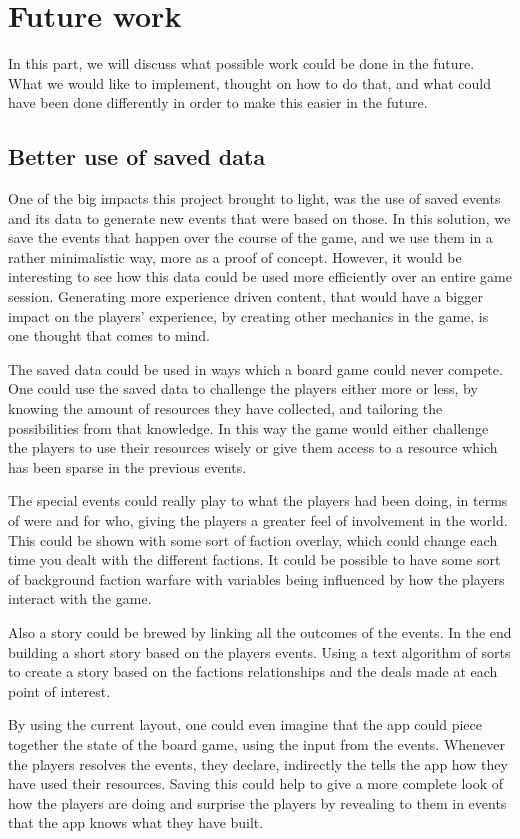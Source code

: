 \section{Future work}
In this part, we will discuss what possible work could be done in the future. What we would like to implement, thought on how to do that, and what could have been done differently in order to make this easier in the future.

\subsection{Better use of saved data}
\label{sec:savdat}
One of the big impacts this project brought to light, was the use of saved events and its data to generate new events that were based on those. In this solution, we save the events that happen over the course of the game, and we use them in a rather minimalistic way, more as a proof of concept. However, it would be interesting to see how this data could be used more efficiently over an entire game session. Generating more experience driven content, that would have a bigger impact on the players' experience, by creating other mechanics in the game, is one thought that comes to mind. 

The saved data could be used in ways which a board game could never compete. One could use the saved data to challenge the players either more or less, by knowing the amount of resources they have collected, and tailoring the possibilities from that knowledge. In this way the game would either challenge the players to use their resources wisely or give them access to a resource which has been sparse in the previous events. 

The special events could really play to what the players had been doing, in terms of were and for who, giving the players a greater feel of involvement in the world. This could be shown with some sort of faction overlay, which could change each time you dealt with the different factions. It could be possible to have some sort of background faction warfare with variables being influenced by how the players interact with the game.

Also a story could be brewed by linking all the outcomes of the events. In the end building a short story based on the players events. Using a text algorithm of sorts to create a story based on the factions relationships and the deals made at each point of interest. 

By using the current layout, one could even imagine that the app could piece together the state of the board game, using the input from the events. Whenever the players resolves the events, they declare, indirectly the tells the app how they have used their resources. Saving this could help to give a more complete look of how the players are doing and surprise the players by revealing to them in events that the app knows what they have built.

